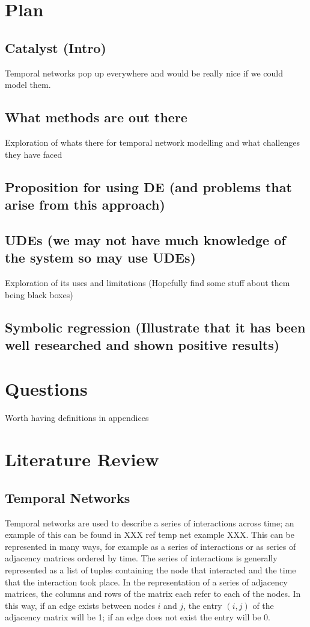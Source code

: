 \documentclass[12pt]{amsart}
\begin{document}
    
\section{Plan}
    \subsection{Catalyst (Intro)}
        Temporal networks pop up everywhere and would be really nice if we could model them.

    \subsection{What methods are out there}
        Exploration of whats there for temporal network modelling and what challenges they have faced
    
    \subsection{Proposition for using DE (and problems that arise from this approach)}

    \subsection{UDEs (we may not have much knowledge of the system so may use UDEs)}
        Exploration of its uses and limitations
        (Hopefully find some stuff about them being black boxes)

    \subsection{Symbolic regression (Illustrate that it has been well researched and shown positive results)}

\section{Questions}
    Worth having definitions in appendices

\section{Literature Review}

\subsection{Temporal Networks}
    Temporal networks are used to describe a series of interactions across time; an example of this can be found in XXX ref temp net example XXX. This can be represented in many ways, for example as a series of interactions or as series of adjacency matrices ordered by time. The series of interactions is generally represented as a list of tuples containing the node that interacted and the time that the interaction took place. In the representation of a series of adjacency matrices, the columns and rows of the matrix each refer to each of the nodes. In this way, if an edge exists between nodes $i$ and $j$, the entry $(i,j)$ of the adjacency matrix will be 1; if an edge does not exist the entry will be 0.
\end{document}
